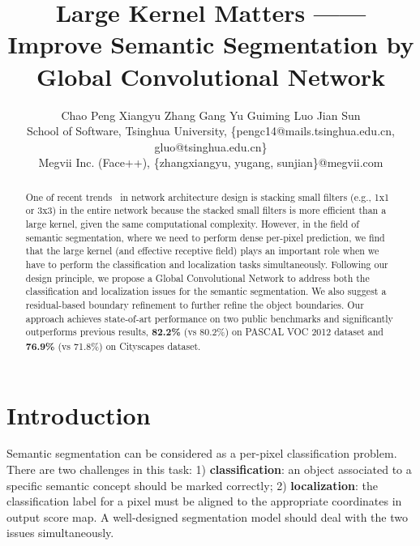 \documentclass[10pt,twocolumn,letterpaper]{article}
\begin{document}
\title{Large Kernel Matters  ------ \\ Improve Semantic Segmentation by Global Convolutional Network}



\author{
   Chao Peng \quad Xiangyu Zhang \quad Gang  Yu \quad Guiming Luo \quad Jian  Sun \vspace{0.10cm}\\
   School of Software, Tsinghua University, \{pengc14@mails.tsinghua.edu.cn, gluo@tsinghua.edu.cn\} \vspace{0.03cm}\\
   Megvii Inc. (Face++), \{zhangxiangyu, yugang, sunjian\}@megvii.com
}





\maketitle


\begin{abstract}
One of recent trends~\cite{simonyan2014very,szegedy2015going,He_2016_CVPR} in network architecture design is stacking small filters (e.g., 1x1 or 3x3) in the entire network because the stacked small filters is more efficient than a large kernel, given the same computational complexity. However, in the field of semantic segmentation, where we need to perform dense per-pixel prediction, we find that the large kernel (and effective receptive field) plays an important role when we have to perform the classification and localization tasks simultaneously. Following our design principle, we propose a Global Convolutional Network to address both the classification and localization issues for the semantic segmentation. We also suggest a residual-based boundary refinement to further refine the object boundaries. Our approach achieves state-of-art performance on two public benchmarks and significantly outperforms previous results, \textbf{82.2\%} (vs 80.2\%) on PASCAL VOC 2012 dataset and \textbf{76.9\%} (vs 71.8\%) on Cityscapes dataset.
\end{abstract}

\section{Introduction}
   Semantic segmentation can be considered as a per-pixel classification problem. There are two challenges in this task: 1) \textbf{classification}: an object associated to a specific semantic concept should be marked correctly; 2) \textbf{localization}: the classification label for a pixel must be aligned to the appropriate coordinates in output score map. A well-designed segmentation model should deal with the two issues simultaneously.
\end{document}
